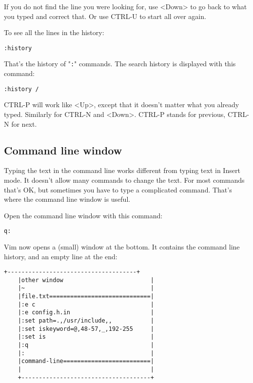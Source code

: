 If you do not find the line you were looking for, use <Down> to go back to what you typed and correct that.
Or use CTRL-U to start all over again.

To see all the lines in the history:

\begin{Verbatim}[samepage=true]
 :history
\end{Verbatim}

That's the history of "\texttt{:}" commands.
The search history is displayed with this command:

\begin{Verbatim}[samepage=true]
 :history /
\end{Verbatim}

CTRL-P will work like <Up>, except that it doesn't matter what you already typed.
Similarly for CTRL-N and <Down>.
CTRL-P stands for previous, CTRL-N for next.
\subsection{Command line window}
Typing the text in the command line works different from typing text in Insert mode.
It doesn't allow many commands to change the text.
For most commands that's OK, but sometimes you have to type a complicated command.
That's where the command line window is useful.

Open the command line window with this command:

\begin{Verbatim}[samepage=true]
 q:
\end{Verbatim}

Vim now opens a (small) window at the bottom.
It contains the command line history, and an empty line at the end:

\begin{Verbatim}[samepage=true]
    +-------------------------------------+
    |other window                         |
    |~                                    |
    |file.txt=============================|
    |:e c                                 |
    |:e config.h.in                       |
    |:set path=.,/usr/include,,           |
    |:set iskeyword=@,48-57,_,192-255     |
    |:set is                              |
    |:q                                   |
    |:                                    |
    |command-line=========================|
    |                                     |
    +-------------------------------------+
\end{Verbatim}

